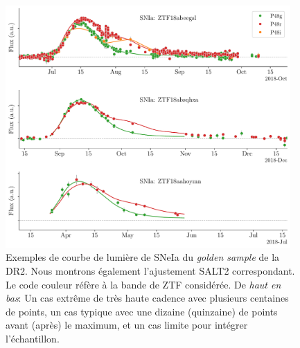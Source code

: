 \documentclass[../main/main.tex]{subfiles}
\begin{document}
\begin{figure}[ht!]
  \centering
  \includegraphics[width=0.97\textwidth]{../figures/09_dr2/lightcurve_example_dr2.pdf}
  \caption[Exemple de courbe de lumière de SNeIa du \textit{golden
    sample} de la DR2.]{Exemples de courbe de lumière de SNeIa du
    \textit{golden sample} de la DR2. Nous montrons également
    l'ajustement SALT2 correspondant. Le code couleur réfère à la bande
    de ZTF considérée. De \emph{haut en bas}: Un cas extrême de très
    haute cadence avec plusieurs centaines de points, un cas typique
    avec une dizaine (quinzaine) de points avant (après) le maximum, et
    un cas limite pour intégrer l'échantillon.}
  \label{fig:lc_example}
\end{figure}
\end{document}
